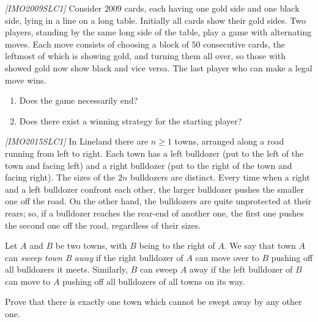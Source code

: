 

%

\renewcommand{\theenumi}{\alph{enumi}}




\noindent
 
\filbreak

\begin{problem}
\textit{[IMO2009SLC1]}
Consider $2009$ cards, each having one gold side and one black side, lying in a line on a long table. Initially all cards show their gold sides. Two players, standing by the same long side of the table, play a game with alternating moves. Each move consists of choosing a block of $50$ consecutive cards, the leftmost of which is showing gold, and turning them all over, so those with showed gold now show black and vice versa. The last player who can make a legal move wins.
\begin{enumerate}
\item Does the game necessarily end?
\item Does there exist a winning strategy for the starting player?
\end{enumerate}

\end{problem}
%

\begin{problem}
\textit{[IMO2015SLC1]}
 In Lineland there are $n \ge 1$ towns, arranged along a road running from left to right. Each town has a left bulldozer (put to the left of the town and facing left) and a right bulldozer (put to the right of the town and facing right). The sizes of the $2n$ bulldozers are distinct. Every time when a right and a left bulldozer confront each other, the larger bulldozer pushes the smaller one oﬀ the road. On the other hand, the bulldozers are quite unprotected at their rears; so, if a bulldozer reaches the rear-end of another one, the ﬁrst one pushes the second one oﬀ the road, regardless of their sizes. 
 
Let $A$ and $B$ be two towns, with $B$ being to the right of $A$. We say that town $A$ can \textit{sweep town B away} if the right bulldozer of $A$ can move over to $B$ pushing oﬀ all bulldozers it meets. Similarly, $B$ can sweep $A$ away if the left bulldozer of $B$ can move to $A$ pushing oﬀ all bulldozers of all towns on its way. 

Prove that there is exactly one town which cannot be swept away by any other one. 

\end{problem}


